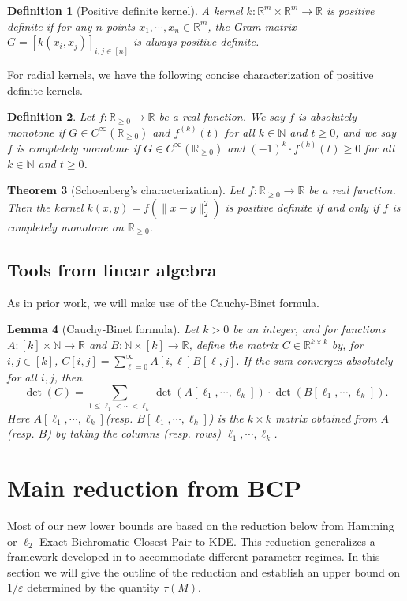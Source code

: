 \documentclass[10pt,a4paper]{article}
\newtheorem{theorem}{Theorem}
\newtheorem{lemma}[theorem]{Lemma}
\newtheorem{definition}[theorem]{Definition}
\theoremstyle{remark}
\numberwithin{equation}{section}
\numberwithin{theorem}{section}
\newcommand{\N}{\ensuremath{\mathbb{N}}}
\newcommand{\R}{\ensuremath{\mathbb{R}}}
\newcommand{\eps}{\varepsilon}
\begin{document}
\begin{definition}[Positive definite kernel]
A kernel $k: \R^m \times \R^m \rightarrow \R$ is positive definite if for any $n$ points $x_1, \cdots, x_n \in \R^m$, the Gram matrix $G = [k(x_i, x_j)]_{i, j \in [n]}$ is always positive definite.
\end{definition}
For radial kernels, we have the following concise characterization of positive definite kernels.
\begin{definition}
Let $f:\R_{\ge 0} \rightarrow \R$ be a real function. We say $f$ is absolutely monotone if $G \in C^{\infty}(\R_{\ge 0})$ and $f^{(k)}(t)$ for all $k \in \N$ and $t \ge 0$, and we say $f$ is completely monotone if $G \in C^{\infty}(\R_{\ge 0})$ and $(-1)^{k} \cdot f^{(k)}(t) \ge 0$ for all $k \in \N$ and $t \ge 0$.
\end{definition}
\begin{theorem}[Schoenberg's characterization] \label{schoenberg} Let $f:\R_{\ge 0} \rightarrow \R$ be a real function. Then the kernel $k(x, y) = f(\|x-y\|_2^2)$ is positive definite if and only if $f$ is completely monotone on $\R_{\ge 0}$.
\end{theorem}

\subsection{Tools from linear algebra}
\label{subsec:CauchyBinetTool}

As in prior work, we will make use of the Cauchy-Binet formula.

\begin{lemma}[Cauchy-Binet formula]
Let $k>0$ be an integer, and for functions $A: [k] \times \N \rightarrow \R$ and $B: \N \times [k] \rightarrow \R$, define the matrix $C \in \R^{k \times k}$ by, for $i, j \in [k]$, $C[i, j] = \sum_{\ell=0}^{\infty} A[i, \ell]B[\ell, j]$.
If the sum converges absolutely for all $i, j$, then
\[\det(C) = \sum_{1 \le \ell_1 < \cdots < \ell_k}
\det(A[\ell_1, \cdots, \ell_k]) \cdot \det(B[\ell_1, \cdots, \ell_k]).\]
Here $A[\ell_1, \cdots, \ell_k]$(resp. $B[\ell_1, \cdots, \ell_k]$) is the $k \times k$ matrix obtained from $A$ (resp. $B$) by taking the columns (resp. rows) $\ell_1, \cdots, \ell_k$.
\end{lemma}

\section{Main reduction from BCP}
\label{sec:mainreduction}
Most of our new lower bounds are based on the reduction below from Hamming or $\ell_2$ Exact Bichromatic Closest Pair to KDE. This reduction generalizes a framework developed in \cite{ACSS20} to accommodate different parameter regimes. In this section we will give the outline of the reduction and establish an upper bound on $1/\eps$ determined by the quantity $\tau(M)$.
\end{document}
